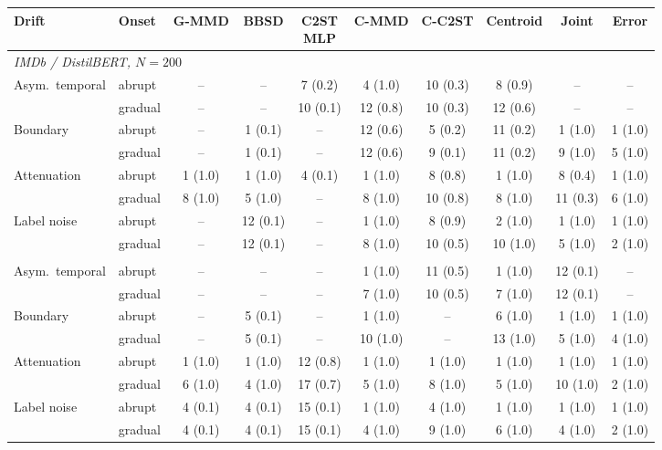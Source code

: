\setlength{\tabcolsep}{2pt}\renewcommand{\arraystretch}{1.1}%
\begin{tabular}{llcccccccc}
\toprule
Drift & Onset & G-MMD & BBSD & \makecell{C2ST\\MLP} & \textbf{C-MMD} & C-C2ST & Centroid & Joint & Error \\
\midrule
\multicolumn{10}{l}{\textit{IMDb / DistilBERT, $N=200$}} \\
Asym.\ temporal & abrupt & -- & -- & 7 (0.2) & 4 (1.0) & 10 (0.3) & 8 (0.9) & -- & -- \\
 & gradual & -- & -- & 10 (0.1) & 12 (0.8) & 10 (0.3) & 12 (0.6) & -- & -- \\
Boundary & abrupt & -- & 1 (0.1) & -- & 12 (0.6) & 5 (0.2) & 11 (0.2) & 1 (1.0) & 1 (1.0) \\
 & gradual & -- & 1 (0.1) & -- & 12 (0.6) & 9 (0.1) & 11 (0.2) & 9 (1.0) & 5 (1.0) \\
Attenuation & abrupt & 1 (1.0) & 1 (1.0) & 4 (0.1) & 1 (1.0) & 8 (0.8) & 1 (1.0) & 8 (0.4) & 1 (1.0) \\
 & gradual & 8 (1.0) & 5 (1.0) & -- & 8 (1.0) & 10 (0.8) & 8 (1.0) & 11 (0.3) & 6 (1.0) \\
Label noise & abrupt & -- & 12 (0.1) & -- & 1 (1.0) & 8 (0.9) & 2 (1.0) & 1 (1.0) & 1 (1.0) \\
 & gradual & -- & 12 (0.1) & -- & 8 (1.0) & 10 (0.5) & 10 (1.0) & 5 (1.0) & 2 (1.0) \\
\addlinespace[3pt]
\multicolumn{10}{l}{\textit{IMDb / DistilBERT, $N=500$}} \\
Asym.\ temporal & abrupt & -- & -- & -- & 1 (1.0) & 11 (0.5) & 1 (1.0) & 12 (0.1) & -- \\
 & gradual & -- & -- & -- & 7 (1.0) & 10 (0.5) & 7 (1.0) & 12 (0.1) & -- \\
Boundary & abrupt & -- & 5 (0.1) & -- & 1 (1.0) & -- & 6 (1.0) & 1 (1.0) & 1 (1.0) \\
 & gradual & -- & 5 (0.1) & -- & 10 (1.0) & -- & 13 (1.0) & 5 (1.0) & 4 (1.0) \\
Attenuation & abrupt & 1 (1.0) & 1 (1.0) & 12 (0.8) & 1 (1.0) & 1 (1.0) & 1 (1.0) & 1 (1.0) & 1 (1.0) \\
 & gradual & 6 (1.0) & 4 (1.0) & 17 (0.7) & 5 (1.0) & 8 (1.0) & 5 (1.0) & 10 (1.0) & 2 (1.0) \\
Label noise & abrupt & 4 (0.1) & 4 (0.1) & 15 (0.1) & 1 (1.0) & 4 (1.0) & 1 (1.0) & 1 (1.0) & 1 (1.0) \\
 & gradual & 4 (0.1) & 4 (0.1) & 15 (0.1) & 4 (1.0) & 9 (1.0) & 6 (1.0) & 4 (1.0) & 2 (1.0) \\

\end{tabular}

